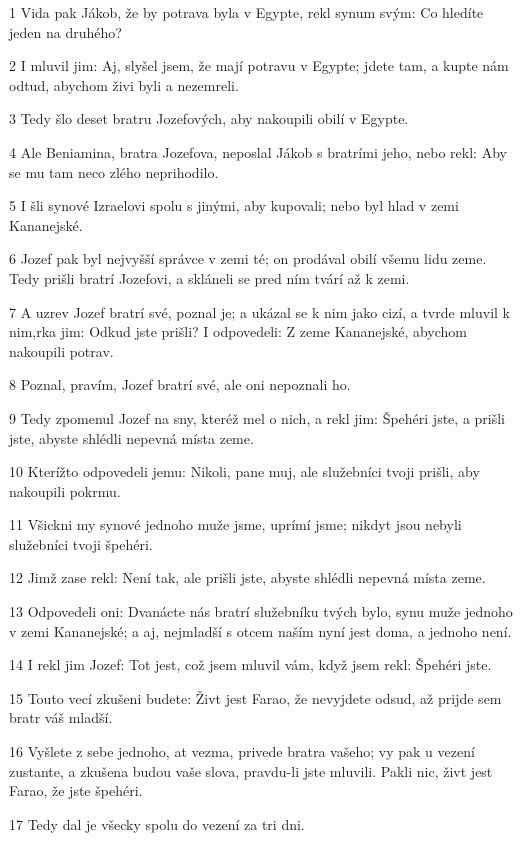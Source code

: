 \par 1 Vida pak Jákob, že by potrava byla v Egypte, rekl synum svým: Co hledíte jeden na druhého?
\par 2 I mluvil jim: Aj, slyšel jsem, že mají potravu v Egypte; jdete tam, a kupte nám odtud, abychom živi byli a nezemreli.
\par 3 Tedy šlo deset bratru Jozefových, aby nakoupili obilí v Egypte.
\par 4 Ale Beniamina, bratra Jozefova, neposlal Jákob s bratrími jeho, nebo rekl: Aby se mu tam neco zlého neprihodilo.
\par 5 I šli synové Izraelovi spolu s jinými, aby kupovali; nebo byl hlad v zemi Kananejské.
\par 6 Jozef pak byl nejvyšší správce v zemi té; on prodával obilí všemu lidu zeme. Tedy prišli bratrí Jozefovi, a skláneli se pred ním tvárí až k zemi.
\par 7 A uzrev Jozef bratrí své, poznal je; a ukázal se k nim jako cizí, a tvrde mluvil k nim,rka jim: Odkud jste prišli? I odpovedeli: Z zeme Kananejské, abychom nakoupili potrav.
\par 8 Poznal, pravím, Jozef bratrí své, ale oni nepoznali ho.
\par 9 Tedy zpomenul Jozef na sny, kteréž mel o nich, a rekl jim: Špehéri jste, a prišli jste, abyste shlédli nepevná místa zeme.
\par 10 Kterížto odpovedeli jemu: Nikoli, pane muj, ale služebníci tvoji prišli, aby nakoupili pokrmu.
\par 11 Všickni my synové jednoho muže jsme, uprímí jsme; nikdyt jsou nebyli služebníci tvoji špehéri.
\par 12 Jimž zase rekl: Není tak, ale prišli jste, abyste shlédli nepevná místa zeme.
\par 13 Odpovedeli oni: Dvanácte nás bratrí služebníku tvých bylo, synu muže jednoho v zemi Kananejské; a aj, nejmladší s otcem naším nyní jest doma, a jednoho není.
\par 14 I rekl jim Jozef: Tot jest, což jsem mluvil vám, když jsem rekl: Špehéri jste.
\par 15 Touto vecí zkušeni budete: Živt jest Farao, že nevyjdete odsud, až prijde sem bratr váš mladší.
\par 16 Vyšlete z sebe jednoho, at vezma, privede bratra vašeho; vy pak u vezení zustante, a zkušena budou vaše slova, pravdu-li jste mluvili. Pakli nic, živt jest Farao, že jste špehéri.
\par 17 Tedy dal je všecky spolu do vezení za tri dni.
